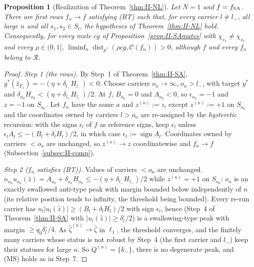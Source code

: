 \documentclass[10pt]{amsart}
\newtheorem{proposition}[theorem]{Proposition}
\theoremstyle{definition}
\theoremstyle{remark}
\newcommand{\sgn}{\operatorname{sign}}
\newcommand{\dist}{\operatorname{dist}}
\newcommand{\Cset}{\mathcal C}
\newcommand{\Rec}{\mathcal R}
\newcommand{\zh}{\hat z}
\begin{document}
\begin{proposition}[Realization of Theorem~\ref{thm:II-NL}]\label{prop:II-NLreal}
Let $N=1$ and $f=f_{\rm SA}$.  There are first rows $f_n\to f$ satisfying
\textup{(BT)} such that, for every carrier $l\ne l_-$, all large $n$ and all
$s_1,s_2\in S_l$, the hypotheses of Theorem~\textup{\ref{thm:II-NL}} hold.
Consequently, for every mate $cg$ of Proposition~\textup{\ref{prop:II-SAmates}}
with $\chi_{s_1}\ne\chi_{s_2}$ and every $\rho\in(0,1]$, $\liminf_n\dist_{p^*}
(\rho cg,\Cset(f_n))>0$, although $f$ and every $f_n$ belong to $\Rec$.
\end{proposition}

\begin{proof}
\emph{Step 1 (the rows).}  By Step~1 of Theorem~\ref{thm:II-SA},
$y^*(\zh_{F_\star})=-(\eta+\delta_{l_-}H_{l_-})<0$.  Choose carriers $o_n\to\infty$,
$o_n>l_-$, with target $y^*$ and $\delta_{o_n}H_{o_n}<(\eta+\delta_{l_-}H_{l_-})/2$.
At $f$, $B_{o_n}=0$ and $A_{o_n}<0$, so $\epsilon_{o_n}=-1$ and $z=-1$ on
$S_{o_n}$.  Let $f_n$ have the same $a$ and $z^{(n)}:=z$, except $z^{(n)}:=+1$ on
$S_{o_n}$ and the coordinates owned by carriers $l>o_n$ are re-assigned by
the \emph{hysteretic} recursion: with the signs $\epsilon_l$ of $f$ as
reference signs, keep $\epsilon_l$ unless $\epsilon_lA_l\le-(B_l+\delta_lH_l)/2$, in
which case $\epsilon_l:=\sgn A_l$.  Coordinates owned by carriers $<o_n$ are
unchanged, so $z^{(n)}\to z$ coordinatewise and $f_n\to f$
(Subsection~\ref{subsec:II-comp}).

\emph{Step 2 ($f_n$ satisfies (BT)).}  Values of carriers $<o_n$ are
unchanged.  $n_{o_n}u_{o_n}(\zh)=A_{o_n}+\delta_{o_n}H_{o_n}\le-(\eta+\delta_{l_-}
H_{l_-})/2$ while $z^{(n)}=+1$ on $S_{o_n}$: $o_n$ is an exactly swallowed
anti-type peak with margin bounded below independently of $n$ (its relative
position tends to infinity, the threshold being bounded).  Every re-run
carrier has $n_l|u_l(\zh)|\ge(B_l+\delta_lH_l)/2$ with sign $\epsilon_l$, hence (Step~4
of Theorem~\ref{thm:II-SA} with $|u_l(\zh)|\ge\delta^\circ_l/2$) is a swallowing-type
peak with margin $\ge q_0\delta^\circ_l/4$.  As $\hat\zeta^{(n)}\to\hat\zeta$ in
$\ell_1$, the threshold converges, and the finitely many carriers whose
status is not robust by Step~4 (the first carrier and $l_-$) keep their
statuses for large $n$.  So $Q^{(n)}=\{k_-\}$, there is no degenerate peak,
and (MS) holds as in Step~7.


\end{proof}
\end{document}
